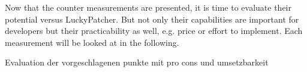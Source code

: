 Now that the counter measurements are presented, it is time to evaluate their potential versus LuckyPatcher. But not only their capabilities are important for developers but their practicability as well, e.g. price or effort to implement. Each measurement will be looked at in the following.



Evaluation der vorgeschlagenen punkte mit pro cons und umsetzbarkeit\newline
